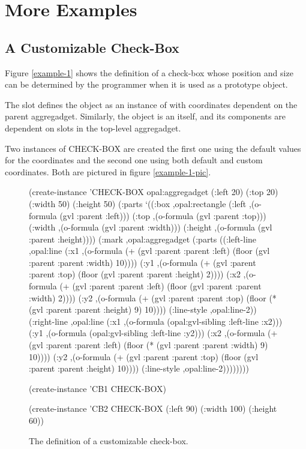 \section{More Examples}

\subsection{A Customizable Check-Box}
\label{Custom-check-box1}

Figure \ref{example-1} shows the definition of a
check-box whose position and size can be determined by the
programmer when it is used as a prototype object.

The  slot
defines the  object as an instance of  with
coordinates dependent on the parent aggregadget.  Similarly, the 
object is an  itself, and its components are dependent
on slots in the top-level aggregadget.

Two instances of CHECK-BOX are created  the first one using the
default values for the coordinates and the second one using both default
and custom coordinates.  Both are pictured in figure
\ref{example-1-pic}.

\begin{figure}
\begin{programexample}
(create-instance 'CHECK-BOX opal:aggregadget
   (:left 20)
   (:top 20)
   (:width 50)
   (:height 50)
   (:parts
    `((:box ,opal:rectangle
         (:left ,(o-formula (gvl :parent :left)))
         (:top ,(o-formula (gvl :parent :top)))
         (:width ,(o-formula (gvl :parent :width)))
         (:height ,(o-formula (gvl :parent :height))))
      (:mark ,opal:aggregadget
         (:parts
          ((:left-line ,opal:line
              (:x1 ,(o-formula (+ (gvl :parent :parent :left)
                     (floor (gvl :parent :parent :width) 10))))
              (:y1 ,(o-formula (+ (gvl :parent :parent :top)
                     (floor (gvl :parent :parent :height) 2))))
              (:x2 ,(o-formula (+ (gvl :parent :parent :left)
                     (floor (gvl :parent :parent :width) 2))))
              (:y2 ,(o-formula (+ (gvl :parent :parent :top)
                     (floor (* (gvl :parent :parent :height) 9)
			    10))))
              (:line-style ,opal:line-2))
          (:right-line ,opal:line
              (:x1 ,(o-formula
		     (opal:gvl-sibling :left-line :x2)))
              (:y1 ,(o-formula
		     (opal:gvl-sibling :left-line :y2)))
              (:x2 ,(o-formula (+ (gvl :parent :parent :left)
                     (floor (* (gvl :parent :parent :width) 9)
			    10))))
              (:y2 ,(o-formula (+ (gvl :parent :parent :top)
                     (floor (gvl :parent :parent :height) 10))))
              (:line-style ,opal:line-2))))))))

(create-instance 'CB1 CHECK-BOX)

(create-instance 'CB2 CHECK-BOX (:left 90) (:width 100) (:height 60))
\end{programexample}
\caption{The definition of a customizable check-box.}
\end{figure}

